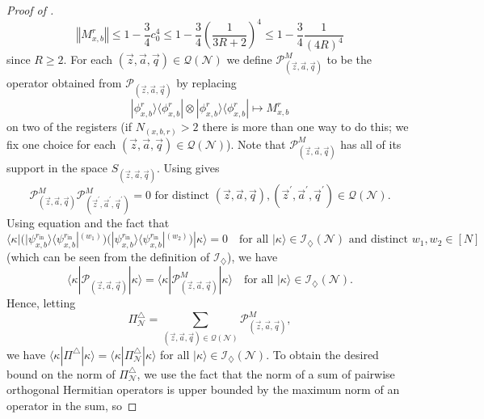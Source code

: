 \documentclass[../thesis-main/thesis-main]{subfiles}
\begin{document}
\begin{proof}[Proof of \protect{}]
\begin{equation}
\left\Vert M_{x,b}^{r}\right\Vert \leq1-\frac{3}{4}c_{0}^{4}\leq1-\frac{3}{4}\left(\frac{1}{3R+2}\right)^{4}\leq1-\frac{3}{4}\frac{1}{(4R)^4}
\end{equation}
since $R\geq2$. For each $(\vec{z},\vec{a},\vec{q})\in\mathcal{Q}(\mathcal{N})$ we define $\mathcal{P}_{(\vec{z},\vec{a},\vec{q})}^{M}$ to be the operator obtained from $\mathcal{P}_{(\vec{z},\vec{a},\vec{q})}$ by replacing
\begin{equation}
|\phi_{x,b}^{r}\rangle\langle\phi_{x,b}^{r}|\otimes|\phi_{x,b}^{r}\rangle\langle\phi_{x,b}^{r}|\mapsto M_{x,b}^{r}
\end{equation}
on two of the registers (if $N_{(x,b,r)}>2$ there is more than one way to do this; we fix one choice for each $(\vec{z},\vec{a},\vec{q})\in\mathcal{Q}(\mathcal{N})$). Note that $\mathcal{P}_{(\vec{z},\vec{a},\vec{q})}^{M}$ has all of its support in the space $S_{(\vec{z},\vec{a},\vec{q})}$. Using  gives
\begin{equation}
\mathcal{P}_{(\vec{z},\vec{a},\vec{q})}^{M}\mathcal{P}_{(\vec{z}^{\prime},\vec{a}^{\prime},\vec{q}^{\prime})}^{M}=0\text{ for distinct }(\vec{z},\vec{a},\vec{q}),(\vec{z}^{\prime},\vec{a}^{\prime},\vec{q}^{\prime})\in\mathcal{Q}(\mathcal{N}).
\end{equation}
Using equation  and the fact that
\begin{equation}
\langle\kappa|\Big(|\psi_{x,b}^{r_{\text{in}}}\rangle\langle\psi_{x,b}^{r_{\text{in}}}|^{(w_{1})}\Big)\Big(|\psi_{x,b}^{r_{\text{in}}}\rangle\langle\psi_{x,b}^{r_{\text{in}}}|^{(w_{2})}\Big)|\kappa\rangle=0\quad\text{for all }|\kappa\rangle\in\mathcal{I}_{\diamondsuit}(\mathcal{N})\text{ and distinct }w_{1},w_{2}\in[N]
\end{equation}
(which can be seen from the definition of $\mathcal{I}_\diamondsuit$), we have 
\begin{equation}
\langle\kappa|\mathcal{P}_{(\vec{z},\vec{a},\vec{q})}|\kappa\rangle=\langle\kappa|\mathcal{P}_{(\vec{z},\vec{a},\vec{q})}^{M}|\kappa\rangle\quad\text{for all }|\kappa\rangle\in\mathcal{I}_{\diamondsuit}(\mathcal{N}).
\end{equation}
Hence, letting 
\begin{equation}
\Pi_{\mathcal{N}}^{\triangle}=\sum_{(\vec{z},\vec{a},\vec{q})\in\mathcal{Q}(\mathcal{N})}\mathcal{P}_{(\vec{z},\vec{a},\vec{q})}^{M},\label{eq:pi_triangle_N}
\end{equation}
we have $\langle\kappa|\Pi^{\triangle}|\kappa\rangle=\langle\kappa|\Pi_{\mathcal{N}}^{\triangle}|\kappa\rangle$ for all $|\kappa\rangle\in\mathcal{I}_{\diamondsuit}(\mathcal{N})$. To obtain the desired bound  on the norm of $\Pi_{\mathcal{N}}^{\triangle}$, we use the fact that the norm of a sum of pairwise orthogonal Hermitian operators is upper bounded by the maximum norm of an operator in the sum, so

\end{proof}
\end{document}
